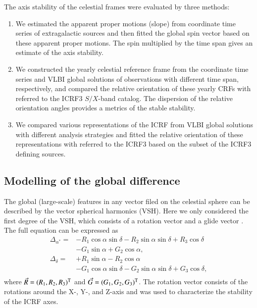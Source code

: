 \documentclass{aa}
\begin{document}
    The axis stability of the celestial frames were evaluated by three methods:
   \begin{enumerate}
      \item We estimated the apparent proper motions (slope) from coordinate time series of extragalactic sources and then fitted the global spin vector based on these apparent proper motions.
      The spin multiplied by the time span gives an estimate of the axis stability.
      \item We constructed the yearly celestial reference frame from the coordinate time series and VLBI global solutions of observations with different time span, respectively, and compared the  relative orientation of these yearly CRFs with referred to the ICRF3 $S/X$-band catalog.
      The dispersion of the relative orientation angles provides a metrics of the stable stability.
      \item We compared various representations of the ICRF from VLBI global solutions with different analysis strategies and fitted the relative orientation of these representations with referred to the ICRF3 based on the subset of the ICRF3 defining sources.
   \end{enumerate}



\subsection{Modelling of the global difference}  \label{subsec:vsh}
    
    The global (large-scale) features in any vector filed on the celestial sphere can be described by the vector spherical harmonics (VSH).
    Here we only considered the first degree of the VSH, which consists of a rotation vector  and a glide vector .
    The full equation can be expressed as
   \begin{equation} \label{eq:vsh01}
      \begin{array}{ll}
        \Delta_{\alpha^*}  = &-R_1\cos\alpha\sin\delta  - R_2\sin\alpha\sin\delta + R_3\cos\delta \\
                    &-G_1\sin\alpha            + G_2\cos\alpha, \\
        \Delta_{\delta}    = &+R_1\sin\alpha            - R_2\cos\alpha \\
                    &-G_1\cos\alpha\sin\delta  - G_2\sin\alpha\sin\delta + G_3\cos\delta, \\
     \end{array}
   \end{equation}
   where $\vec{R}=(R_1,R_2,R_3)^{\rm T}$ and $\vec{G}=(G_1,G_2,G_3)^{\rm T}$.
    The rotation vector consists of the rotations around the X-, Y-, and Z-axis and was used to characterize the stability of the ICRF axes.
    
\end{document}
